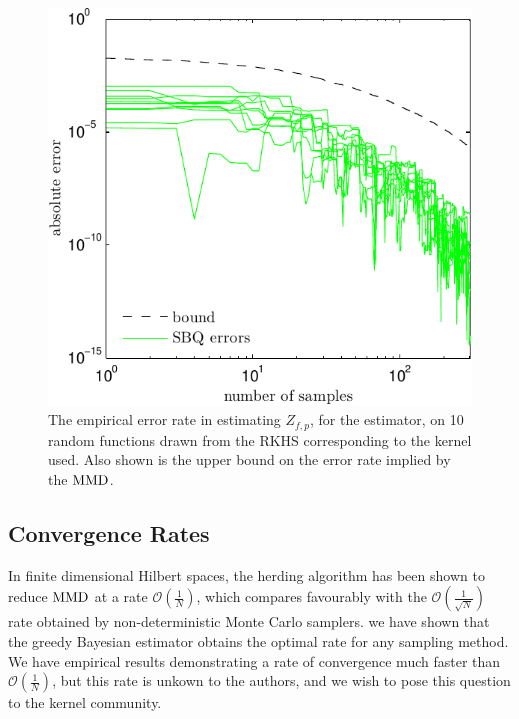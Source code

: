 \documentclass[]{article}
\begin{document}
\begin{figure}
\includegraphics[width=\columnwidth]{figures/bound_curve_rkhs}
\caption{The empirical error rate in estimating $Z_{f,p}$,  for the \sbq{} estimator, on 10 random functions drawn from the RKHS corresponding to the kernel used.  Also shown is the upper bound on the error rate implied by the ${\rm MMD}$.}
\label{fig:bound_curve}
\end{figure}
%


\subsection{Convergence Rates}

In finite dimensional Hilbert spaces, the herding algorithm has been shown to reduce ${\rm MMD}$ at a rate $\mathcal{O}(\frac{1}{N})$, which compares favourably with the $\mathcal{O}(\frac{1}{\sqrt{N}})$ rate obtained by non-deterministic Monte Carlo samplers.%
we have shown that the greedy Bayesian estimator obtains the optimal rate for any sampling method.  We have empirical results demonstrating a rate of convergence much faster than $\mathcal{O}(\frac{1}{N})$, but this rate is unkown to the authors, and we wish to pose this question to the kernel community.

\pagebreak



\end{document}
